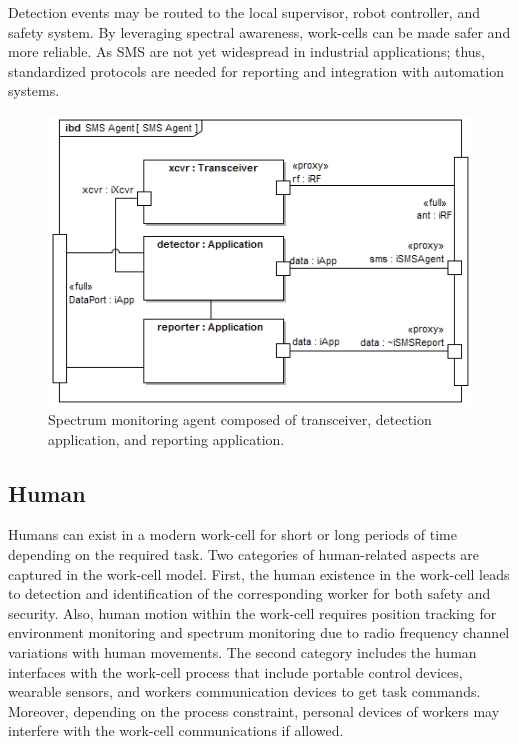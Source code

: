 Detection events may be routed to the local supervisor, robot controller, and safety system.  By leveraging spectral awareness, work-cells can be made safer and more reliable.  As SMS are not yet widespread in industrial applications; thus, standardized protocols are needed for reporting and integration with automation systems.

\begin{figure}[tbp]
	\centering
	\includegraphics[width=0.99\columnwidth]{./chapter-sysml/diagrams/ibd__SMS_Agent__SMS_Agent}
	\caption{Spectrum monitoring agent composed of transceiver, detection application, and reporting application.}
	\label{sysml:fig:sms:bdd}
\end{figure}

\subsection{Human}\label{sysml:sec:human}

Humans can exist in a modern work-cell for short or long periods of time depending on the required task. Two categories of human-related aspects are captured in the work-cell model. First, the human existence in the work-cell leads to detection and identification of the corresponding worker for both safety and security. Also, human motion within the work-cell requires position tracking for environment monitoring and spectrum monitoring due to radio frequency channel variations with human movements. The second category includes the human interfaces with the work-cell process that include portable control devices, wearable sensors, and workers communication devices to get task commands. Moreover, depending on the process constraint, personal devices of workers may interfere with the work-cell communications if allowed.      


